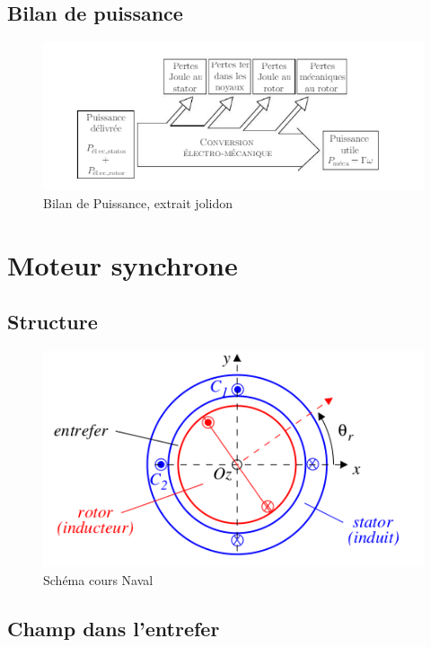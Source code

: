 \documentclass[10pt]{beamer}
\begin{document}
\subsection{Bilan de puissance}
\begin{frame}{\insertsubsection}
\begin{figure}[ht]
	\centering
	\includegraphics[width=1\textwidth]{BillanPuissance.png}
	\caption{Bilan de Puissance, extrait jolidon}
\end{figure}
\end{frame}
\section{Moteur synchrone}
\subsection{Structure}

\begin{frame}{\insertsubsection}
    \begin{figure}[ht]
	\centering
	\includegraphics[width=.5\textwidth]{StructureMachinesynchrone.png}
	\caption{Schéma cours Naval}
\end{figure}
    \end{frame}

\subsection{Champ dans l'entrefer}
\end{document}
